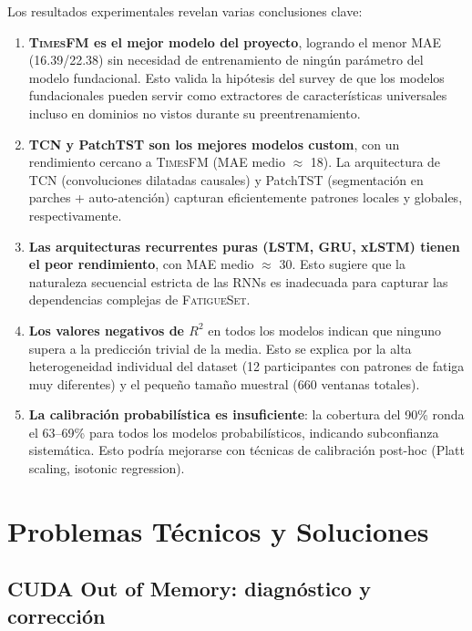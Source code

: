 \documentclass[12pt, a4paper]{article}
\newcommand{\fatigueset}{\textsc{FatigueSet}}
\newcommand{\timesfm}{\textsc{TimesFM}}
\begin{document}
Los resultados experimentales revelan varias conclusiones clave:

\begin{enumerate}
    \item \textbf{\timesfm{} es el mejor modelo del proyecto}, logrando el menor MAE (16.39/22.38) sin necesidad de entrenamiento de ningún parámetro del modelo fundacional. Esto valida la hipótesis del survey de que los modelos fundacionales pueden servir como extractores de características universales incluso en dominios no vistos durante su preentrenamiento.

    \item \textbf{TCN y PatchTST son los mejores modelos custom}, con un rendimiento cercano a \timesfm{} (MAE medio $\approx$ 18). La arquitectura de TCN (convoluciones dilatadas causales) y PatchTST (segmentación en parches + auto-atención) capturan eficientemente patrones locales y globales, respectivamente.

    \item \textbf{Las arquitecturas recurrentes puras (LSTM, GRU, xLSTM) tienen el peor rendimiento}, con MAE medio $\approx$ 30. Esto sugiere que la naturaleza secuencial estricta de las RNNs es inadecuada para capturar las dependencias complejas de \fatigueset{}.

    \item \textbf{Los valores negativos de $R^2$} en todos los modelos indican que ninguno supera a la predicción trivial de la media. Esto se explica por la alta heterogeneidad individual del dataset (12 participantes con patrones de fatiga muy diferentes) y el pequeño tamaño muestral (660 ventanas totales).

    \item \textbf{La calibración probabilística es insuficiente}: la cobertura del 90\% ronda el 63--69\% para todos los modelos probabilísticos, indicando subconfianza sistemática. Esto podría mejorarse con técnicas de calibración post-hoc (Platt scaling, isotonic regression).
\end{enumerate}


\section{Problemas Técnicos y Soluciones}
\label{sec:problemas}

\subsection{CUDA Out of Memory: diagnóstico y corrección}
\label{sec:problemas_oom}
\end{document}
